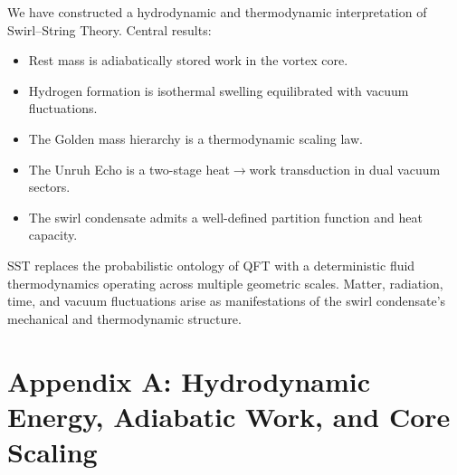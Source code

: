 \documentclass[11pt]{article}
\begin{document}
        We have constructed a hydrodynamic and thermodynamic interpretation of
        Swirl--String Theory. Central results:
        \begin{itemize}
            \item Rest mass is adiabatically stored work in the vortex core.
            \item Hydrogen formation is isothermal swelling equilibrated with vacuum
            fluctuations.
            \item The Golden mass hierarchy is a thermodynamic scaling law.
            \item The Unruh Echo is a two-stage heat$\rightarrow$work transduction in dual
            vacuum sectors.
            \item The swirl condensate admits a well-defined partition function and heat
            capacity.
        \end{itemize}

        SST replaces the probabilistic ontology of QFT with a deterministic fluid
        thermodynamics operating across multiple geometric scales. Matter, radiation, time,
        and vacuum fluctuations arise as manifestations of the swirl condensate’s mechanical
        and thermodynamic structure.


        \appendix

    \section*{Appendix A: Hydrodynamic Energy, Adiabatic Work, and Core Scaling}
\end{document}
